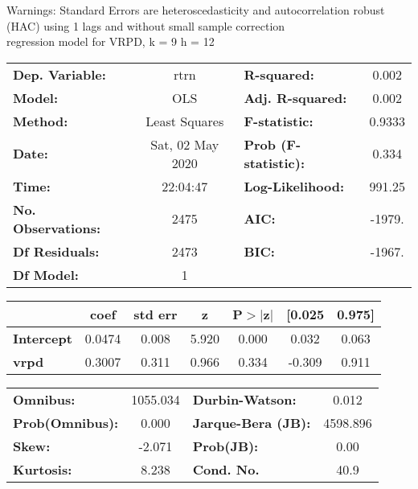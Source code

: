 Warnings: \newline
 [1] Standard Errors are heteroscedasticity and autocorrelation robust (HAC) using 1 lags and without small sample correction\\ 

regression model for VRPD, k = 9 h = 12\begin{center}
\begin{tabular}{lclc}
\toprule
\textbf{Dep. Variable:}    &       rtrn       & \textbf{  R-squared:         } &     0.002   \\
\textbf{Model:}            &       OLS        & \textbf{  Adj. R-squared:    } &     0.002   \\
\textbf{Method:}           &  Least Squares   & \textbf{  F-statistic:       } &    0.9333   \\
\textbf{Date:}             & Sat, 02 May 2020 & \textbf{  Prob (F-statistic):} &    0.334    \\
\textbf{Time:}             &     22:04:47     & \textbf{  Log-Likelihood:    } &    991.25   \\
\textbf{No. Observations:} &        2475      & \textbf{  AIC:               } &    -1979.   \\
\textbf{Df Residuals:}     &        2473      & \textbf{  BIC:               } &    -1967.   \\
\textbf{Df Model:}         &           1      & \textbf{                     } &             \\
\bottomrule
\end{tabular}
\begin{tabular}{lcccccc}
                   & \textbf{coef} & \textbf{std err} & \textbf{z} & \textbf{P$> |$z$|$} & \textbf{[0.025} & \textbf{0.975]}  \\
\midrule
\textbf{Intercept} &       0.0474  &        0.008     &     5.920  &         0.000        &        0.032    &        0.063     \\
\textbf{vrpd}      &       0.3007  &        0.311     &     0.966  &         0.334        &       -0.309    &        0.911     \\
\bottomrule
\end{tabular}
\begin{tabular}{lclc}
\textbf{Omnibus:}       & 1055.034 & \textbf{  Durbin-Watson:     } &    0.012  \\
\textbf{Prob(Omnibus):} &   0.000  & \textbf{  Jarque-Bera (JB):  } & 4598.896  \\
\textbf{Skew:}          &  -2.071  & \textbf{  Prob(JB):          } &     0.00  \\
\textbf{Kurtosis:}      &   8.238  & \textbf{  Cond. No.          } &     40.9  \\
\bottomrule
\end{tabular}
\end{center}

